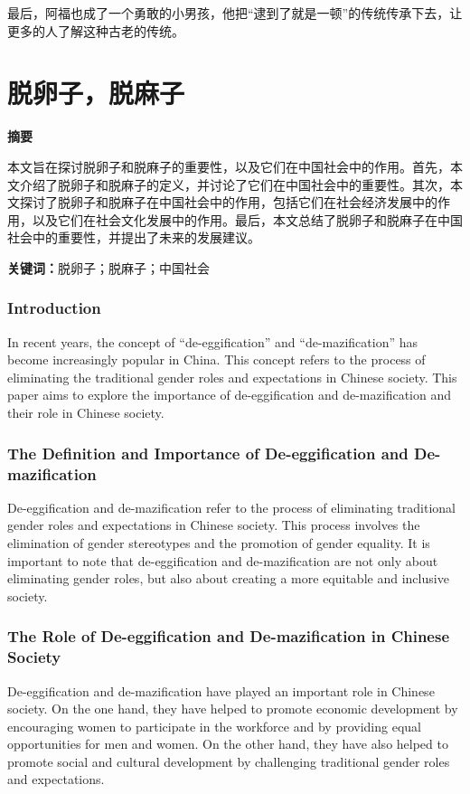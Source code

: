 \documentclass[titlepage,oneside]{ctexbook}
\begin{document}
最后，阿福也成了一个勇敢的小男孩，他把“逮到了就是一顿”的传统传承下去，让更多的人了解这种古老的传统。

\chapter{脱卵子，脱麻子}
\begin{center}
    \textbf{摘要}
\end{center}
本文旨在探讨脱卵子和脱麻子的重要性，以及它们在中国社会中的作用。首先，本文介绍了脱卵子和脱麻子的定义，并讨论了它们在中国社会中的重要性。其次，本文探讨了脱卵子和脱麻子在中国社会中的作用，包括它们在社会经济发展中的作用，以及它们在社会文化发展中的作用。最后，本文总结了脱卵子和脱麻子在中国社会中的重要性，并提出了未来的发展建议。

\noindent \textbf{关键词：}脱卵子；脱麻子；中国社会

\subsection*{Introduction}

In recent years, the concept of “de-eggification” and “de-mazification” has become increasingly popular in China. This concept refers to the process of eliminating the traditional gender roles and expectations in Chinese society. This paper aims to explore the importance of de-eggification and de-mazification and their role in Chinese society.

\subsection*{The Definition and Importance of De-eggification and De-mazification}

De-eggification and de-mazification refer to the process of eliminating traditional gender roles and expectations in Chinese society. This process involves the elimination of gender stereotypes and the promotion of gender equality. It is important to note that de-eggification and de-mazification are not only about eliminating gender roles, but also about creating a more equitable and inclusive society.

\subsection*{The Role of De-eggification and De-mazification in Chinese Society}

De-eggification and de-mazification have played an important role in Chinese society. On the one hand, they have helped to promote economic development by encouraging women to participate in the workforce and by providing equal opportunities for men and women. On the other hand, they have also helped to promote social and cultural development by challenging traditional gender roles and expectations.
\end{document}
